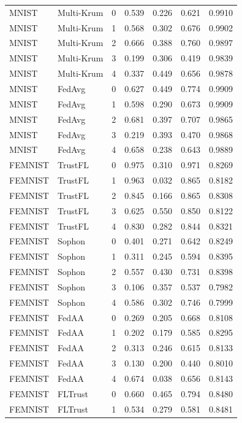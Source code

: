\begin{tabular}{llrrrrr}
MNIST & Multi-Krum & 0 & 0.539 & 0.226 & 0.621 & 0.9910 \\
MNIST & Multi-Krum & 1 & 0.568 & 0.302 & 0.676 & 0.9902 \\
MNIST & Multi-Krum & 2 & 0.666 & 0.388 & 0.760 & 0.9897 \\
MNIST & Multi-Krum & 3 & 0.199 & 0.306 & 0.419 & 0.9839 \\
MNIST & Multi-Krum & 4 & 0.337 & 0.449 & 0.656 & 0.9878 \\
MNIST & FedAvg & 0 & 0.627 & 0.449 & 0.774 & 0.9909 \\
MNIST & FedAvg & 1 & 0.598 & 0.290 & 0.673 & 0.9909 \\
MNIST & FedAvg & 2 & 0.681 & 0.397 & 0.707 & 0.9865 \\
MNIST & FedAvg & 3 & 0.219 & 0.393 & 0.470 & 0.9868 \\
MNIST & FedAvg & 4 & 0.658 & 0.238 & 0.643 & 0.9889 \\
FEMNIST & TrustFL & 0 & 0.975 & 0.310 & 0.971 & 0.8269 \\
FEMNIST & TrustFL & 1 & 0.963 & 0.032 & 0.865 & 0.8182 \\
FEMNIST & TrustFL & 2 & 0.845 & 0.166 & 0.865 & 0.8308 \\
FEMNIST & TrustFL & 3 & 0.625 & 0.550 & 0.850 & 0.8122 \\
FEMNIST & TrustFL & 4 & 0.830 & 0.282 & 0.844 & 0.8321 \\
FEMNIST & Sophon & 0 & 0.401 & 0.271 & 0.642 & 0.8249 \\
FEMNIST & Sophon & 1 & 0.311 & 0.245 & 0.594 & 0.8395 \\
FEMNIST & Sophon & 2 & 0.557 & 0.430 & 0.731 & 0.8398 \\
FEMNIST & Sophon & 3 & 0.106 & 0.357 & 0.537 & 0.7982 \\
FEMNIST & Sophon & 4 & 0.586 & 0.302 & 0.746 & 0.7999 \\
FEMNIST & FedAA & 0 & 0.269 & 0.205 & 0.668 & 0.8108 \\
FEMNIST & FedAA & 1 & 0.202 & 0.179 & 0.585 & 0.8295 \\
FEMNIST & FedAA & 2 & 0.313 & 0.246 & 0.615 & 0.8133 \\
FEMNIST & FedAA & 3 & 0.130 & 0.200 & 0.440 & 0.8010 \\
FEMNIST & FedAA & 4 & 0.674 & 0.038 & 0.656 & 0.8143 \\
FEMNIST & FLTrust & 0 & 0.660 & 0.465 & 0.794 & 0.8480 \\
FEMNIST & FLTrust & 1 & 0.534 & 0.279 & 0.581 & 0.8481 \\

\end{tabular}
